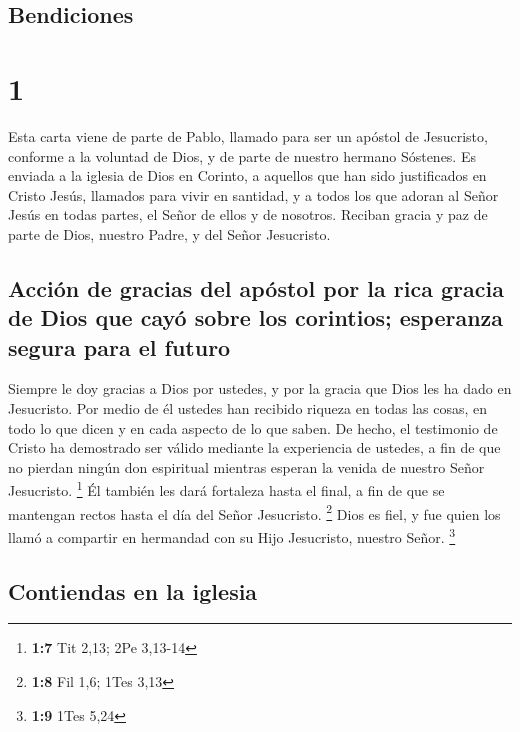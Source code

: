\hypertarget{bendiciones}{%
\subsection{Bendiciones}\label{bendiciones}}

\hypertarget{section}{%
\section{1}\label{section}}

 Esta carta viene de parte de Pablo, llamado para ser un
apóstol de Jesucristo, conforme a la voluntad de Dios, y de parte de
nuestro hermano Sóstenes.  Es enviada a la iglesia de Dios
en Corinto, a aquellos que han sido justificados en Cristo Jesús,
llamados para vivir en santidad, y a todos los que adoran al Señor Jesús
en todas partes, el Señor de ellos y de nosotros.  Reciban
gracia y paz de parte de Dios, nuestro Padre, y del Señor Jesucristo.

\hypertarget{acciuxf3n-de-gracias-del-apuxf3stol-por-la-rica-gracia-de-dios-que-cayuxf3-sobre-los-corintios-esperanza-segura-para-el-futuro}{%
\subsection{Acción de gracias del apóstol por la rica gracia de Dios que
cayó sobre los corintios; esperanza segura para el
futuro}\label{acciuxf3n-de-gracias-del-apuxf3stol-por-la-rica-gracia-de-dios-que-cayuxf3-sobre-los-corintios-esperanza-segura-para-el-futuro}}

 Siempre le doy gracias a Dios por ustedes, y por la
gracia que Dios les ha dado en Jesucristo.  Por medio de
él ustedes han recibido riqueza en todas las cosas, en todo lo que dicen
y en cada aspecto de lo que saben.  De hecho, el
testimonio de Cristo ha demostrado ser válido mediante la experiencia de
ustedes,  a fin de que no pierdan ningún don espiritual
mientras esperan la venida de nuestro Señor Jesucristo. \footnote{\textbf{1:7}
  Tit 2,13; 2Pe 3,13-14}  Él también les dará fortaleza
hasta el final, a fin de que se mantengan rectos hasta el día del Señor
Jesucristo. \footnote{\textbf{1:8} Fil 1,6; 1Tes 3,13} 
Dios es fiel, y fue quien los llamó a compartir en hermandad con su Hijo
Jesucristo, nuestro Señor. \footnote{\textbf{1:9} 1Tes 5,24}

\hypertarget{contiendas-en-la-iglesia}{%
\subsection{Contiendas en la iglesia}\label{contiendas-en-la-iglesia}}


